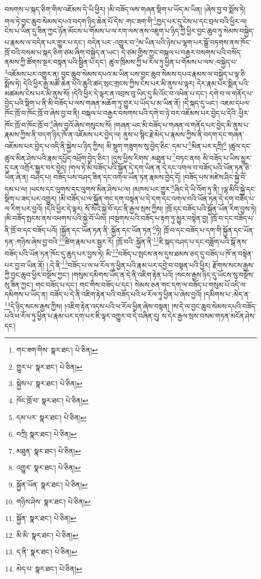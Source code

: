 བསགས་པ་སྐད་ཅིག་གིས་འཇོམས་དེ་ཡི་ཕྱིར། །མི་བཟོད་ལས་གཞན་སྡིག་པ་ཡོད་མ་ཡིན། །ཞེས་བྱ་བ་སྨོས་ཏེ། གལ་ཏེ་བྱང་ཆུབ་སེམས་དཔའ་བདག་ཉིད་ཆེན་པོ་དེས་:གང་ཟག་གི་\footnote{གང་ཟག་གིས་  སྣར་ཐང་།  པེ་ཅིན། }ཁྱད་པར་དུ་ངེས་པ་དང་བྲལ་བའི་ཕྱིར་ལ། ངེས་པ་ཡིན་དུ་ཟིན་ཀྱང་ཉོན་མོངས་པ་གོམས་པ་ལ་རག་ལས་ནས་འཇུག་པ་ཉིད་ཀྱི་ཕྱིར་བྱང་ཆུབ་ཏུ་སེམས་བསྐྱེད་པ་རྣམས་ལ་བདེན་པར་གྱུར་པ་དང་། བདེན་པར་:འགྱུར་བ་\footnote{གྱུར་པ་  སྣར་ཐང་།  པེ་ཅིན། }མ་ཡིན་པའི་ཉེས་པ་ལྷག་པར་སྒྲོ་བཏགས་ནས་ཁོང་ཁྲོ་བའི་བསམ་པ་སྐད་ཅིག་ཙམ་ཞིག་བསྐྱེད་ན་ཡང་། དེ་ཙམ་གྱིས་ཀྱང་བསྐལ་པ་བརྒྱར་བསགས་པའི་བསོད་ནམས་ཀྱི་ཚོགས་སྔར་བསྟན་པའི་སྦྱིན་པ་དང་། ཚུལ་ཁྲིམས་ཀྱི་ཕ་རོལ་ཏུ་ཕྱིན་པ་གོམས་པ་ལས་:བསྐྱེད་པ་\footnote{སྐྱེས་པ་  སྣར་ཐང་།  པེ་ཅིན། }འཇོམས་པར་འགྱུར་ན། བྱང་ཆུབ་སེམས་དཔའ་མ་ཡིན་པས་བྱང་ཆུབ་སེམས་དཔའ་རྣམས་ལ་བསྐྱེད་པ་ལྟ་ཅི་སྨོས་ཏེ། དེའི་ཕྱིར་རྒྱ་མཚོ་ཆེན་པོའི་ཆུའི་ཚད་སྲང་གྲངས་ཀྱིས་ངེས་པར་མི་ནུས་པ་ལྟར། དེར་རྣམ་པར་སྨིན་པའི་མཚམས་ངེས་པར་མི་ནུས་སོ། །དེའི་ཕྱིར་དེ་ལྟར་ན་འབྲས་བུ་ཡིད་དུ་མི་འོང་བ་འཕེན་པ་དང་། དགེ་བ་ལ་གནོད་པ་བྱེད་པའི་སྡིག་པ་ནི་མི་བཟོད་པ་ལས་གཞན་མཆོག་ཏུ་གྱུར་པ་ཡོད་པ་མ་ཡིན་ནོ། །དེ་སྐད་དུ་ཡང་། འཇམ་དཔལ་ཁོང་ཁྲོ་བ་ཁོང་ཁྲོ་བ་ཞེས་བྱ་བ་ནི། བསྐལ་པ་བརྒྱར་བསགས་པའི་དགེ་བ་ཉེ་བར་འཇོམས་པར་བྱེད་པ་དེའི་:ཕྱིར་ཁོང་ཁྲོ་བ་ཁོང་ཁྲོ་བ་\footnote{ཁོང་ཁྲོ་བ་  སྣར་ཐང་།  པེ་ཅིན། }ཞེས་བྱའོ་ཞེས་གསུངས་སོ། །གཞན་ཡང་མི་བཟོད་པ་གཞན་ལ་གནོད་པར་བྱེད་མི་ནུས་པ་རྣམས་ཀྱིས་ནི་བདག་ཉིད་ཁོ་ན་འཇོམས་པར་བྱེད་ལ། ནུས་པ་སྙིང་རྗེ་མེད་པ་རྣམས་ཀྱིས་ནི་བདག་དང་གཞན་འཇོམས་པར་བྱེད་པ་འདི་ནི་སྐྱེས་པ་ཉིད་ཀྱིས། མི་སྡུག་གཟུགས་སུ་བྱེད་ཅིང་:དམ་པ་\footnote{དམ་པར་  སྣར་ཐང་།  པེ་ཅིན། }མིན་པར་དཀྲི།\footnote{བཀྲི།  སྣར་ཐང་།  པེ་ཅིན། } །ཚུལ་དང་ཚུལ་མིན་ཤེས་པའི་རྣམ་དཔྱོད་འཕྲོག་བྱེད་ཅིང་། །དུས་ཕྱིས་རིགས་:མཐུན་པ་\footnote{མཐུན་  སྣར་ཐང་།  པེ་ཅིན། }བཏང་ནས། མི་བཟོད་པ་ཡིས་མྱུར་དུ་ངན་འགྲོར་སྐྱུར་བར་བྱེད། །གལ་ཏེ་མི་བཟོད་པའི་སྐྱོན་དེ་དག་ཡིན་ན་དེ་དང་འགལ་བ་བཟོད་པའི་ཡོན་ཏན་ཅི་ཡིན་ཞེ་ན། བཤད་པ། བཟོད་པས་བཤད་ཟིན་དང་འགལ་ཡོན་ཏན་རྣམས་བྱེད་དོ། །བཟོད་པས་མཛེས་ཤིང་སྐྱེ་བོ་དམ་པ་ལ། །ཕངས་དང་ལུགས་དང་ལུགས་མིན་ཤེས་པ་ལ། །མཁས་པར་གྱུར་\footnote{འགྱུར་  སྣར་ཐང་།  པེ་ཅིན། }ཞིང་དེ་ཡི་འོག་ཏུ་ནི། །ལྷ་མིའི་སྐྱེ་དང་སྡིག་པ་ཟད་པར་འགྱུར། །མི་བཟོད་པ་ལ་སྐྱོན་གང་དག་བསྟན་པ་དེ་དག་དང་འགལ་བའི་ཡོན་ཏན་དེ་དག་བཟོད་པ་ལ་རིག་པར་བྱའོ། །དེའི་ཕྱིར་དེ་ལྟར། སོ་སོའི་སྐྱེ་བོ་དང་ནི་རྒྱལ་སྲས་ཀྱིས། །ཁྲོ་དང་བཟོད་པའི་སྐྱོན་ཡོན་རིག་བྱས་ཏེ། །མི་བཟོད་སྤངས་ནས་འཕགས་པའི་སྐྱེ་བོ་ཡིས། །བསྔགས་པའི་བཟོད་པ་རྟག་ཏུ་མྱུར་བསྟེན་བྱ། །ཁྲོ་བ་དང་བཟོད་པ་ནི་ཁྲོ་བ་དང་བཟོད་པའོ། །སྐྱོན་དང་ཡོན་ཏན་ནི་:སྐྱོན་དང་ཡོན་ཏན་\footnote{སྐྱོན་ཡོན་  སྣར་ཐང་།  པེ་ཅིན། }ཏེ། ཁྲོ་བ་དང་བཟོད་པ་དག་གི་སྐྱོན་དང་ཡོན་ཏན་:གཉིས་ཞེས་བྱ་བའི་\footnote{གཉིས་ཤེས་  སྣར་ཐང་།  པེ་ཅིན། }ཚིག་རྣམ་པར་སྦྱར་རོ། །ཁྲོ་བའི་:སྐྱོན་ནི་\footnote{སྐྱོན་  སྣར་ཐང་།  པེ་ཅིན། }ཇི་སྐད་བཤད་པ་དང་བཟློག་པའི་སྒོ་ནས་བཟོད་པའི་ཡོན་ཏན་ཁོང་དུ་ཆུད་པར་བྱས་ཏེ། མི་\footnote{མི་མི་  སྣར་ཐང་།  པེ་ཅིན། }བཟོད་པ་སྤངས་ནས་དུས་ཐམས་ཅད་དུ་བཟོད་པ་ཁོ་ན་བསྟེན་པར་བྱ་བ་ཡིན་ནོ། །:དེ་ནི་\footnote{ད་ནི་  སྣར་ཐང་།  པེ་ཅིན། }བཟོད་པ་ལ་ཕ་རོལ་ཏུ་ཕྱིན་པའི་རྣམ་པར་དབྱེ་བ་བསྟན་པའི་ཕྱིར། རྫོགས་སངས་རྒྱས་ཀྱི་བྱང་ཆུབ་ཕྱིར་བསྔོས་ཀྱང་། །གསུམ་དམིགས་ཡོད་ན་དེ་ནི་འཇིག་རྟེན་པའོ། །སངས་རྒྱས་ཉིད་དུ་ཡོངས་སུ་བསྔོས་སུ་ཟིན་ཀྱང་། གང་བཟོད་པ་དང་། གང་གིས་བཟོད་པ་དང་། སེམས་ཅན་གང་དག་ལ་བཟོད་པ་གསུམ་པོ་འདི་ལ་དམིགས་པ་ཡོད་ན། བཟོད་པ་དེ་ནི་འཇིག་རྟེན་པའི་བཟོད་པའི་ཕ་རོལ་ཏུ་ཕྱིན་པ་ཞེས་བྱའོ། །དམིགས་པ་:མེད་ན་\footnote{མེད་པ་  སྣར་ཐང་།  པེ་ཅིན། }དེ་ཉིད་སངས་རྒྱས་ཀྱིས། །འཇིག་རྟེན་འདས་པའི་ཕ་རོལ་ཕྱིན་ཞེས་བསྟན། །ས་དེ་ལ་བྱང་ཆུབ་སེམས་དཔའི་བཟོད་པའི་ཕ་རོལ་ཏུ་ཕྱིན་པ་རྣམ་པར་དག་པར་ཇི་ལྟར་འགྱུར་བ་དེ་བཞིན་དུ། ས་དེར་རྒྱལ་སྲས་བསམ་གཏན་མངོན་ཤེས་དང་། 